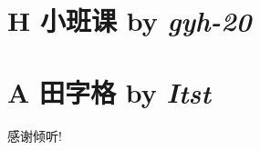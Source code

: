 \documentclass[dvipsnames]{ctexbeamer}
\begin{document}
\section{H 小班课 by \itshape gyh-20}






\section{A 田字格 by \itshape Itst}


% 


\begin{frame}{}
    \begin{center}
        \Large 感谢倾听!
    \end{center}
\end{frame}
\end{document}
